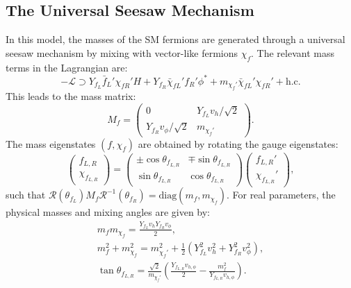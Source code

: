 \subsection{The Universal Seesaw Mechanism}

In this model, the masses of the SM fermions are generated through a universal seesaw mechanism by mixing with vector-like fermions $\chi_f$. The relevant mass terms in the Lagrangian are:
\begin{equation}
    -\mathcal{L} \supset Y_{f_L} \bar{f}_L' \chi_{fR}' H + Y_{f_R} \bar{\chi}_{fL}' f_R' \phi^* + m_{\chi_f'} \bar{\chi}_{f L}' \chi_{f R}' + \text{h.c.}
\end{equation}
This leads to the mass matrix:
\begin{equation}
    M_f = \begin{pmatrix}
        0 & Y_{f_L} v_h / \sqrt{2} \\
        Y_{f_R} v_\phi / \sqrt{2} & m_{\chi_f'}
    \end{pmatrix}.
\end{equation}
The mass eigenstates $(f, \chi_f)$ are obtained by rotating the gauge eigenstates:
\begin{equation}
    \begin{pmatrix}
        f_{L,R} \\
        \chi_{f_{L,R}}
    \end{pmatrix}
    =
    \begin{pmatrix}
        \pm \cos\theta_{f_{L,R}} & \mp \sin \theta_{f_{L,R}} \\
        \sin \theta_{f_{L,R}} & \cos\theta_{f_{L,R}}
    \end{pmatrix}
    \begin{pmatrix}
        f_{L,R}' \\
        \chi_{f_{L,R}}'
    \end{pmatrix},
\end{equation}
such that $\mathcal{R}(\theta_{f_L}) M_f \mathcal{R}^{-1}(\theta_{f_R}) = \text{diag}(m_f, m_{\chi_f})$. For real parameters, the physical masses and mixing angles are given by:
\begin{gather}
    m_f m_{\chi_f} = \frac{ Y_{f_L} v_h Y_{f_R} v_\phi }{2}, \label{eq:prodmass} \\
    m_f^2 + m_{\chi_f}^2 = m_{\chi_f'}^2 + \frac{1}{2} \left( Y_{f_L}^2 v_h^2 + Y_{f_R}^2 v_\phi^2 \right), \label{eq:summass} \\
    \tan \theta_{f_{L,R}} = \frac{\sqrt{2}}{m_{\chi_f'}} \left( \frac{Y_{f_{L,R}} v_{h,\phi}}{2} - \frac{m_f^2}{Y_{f_{L,R}} v_{h,\phi}} \right).
\end{gather}
